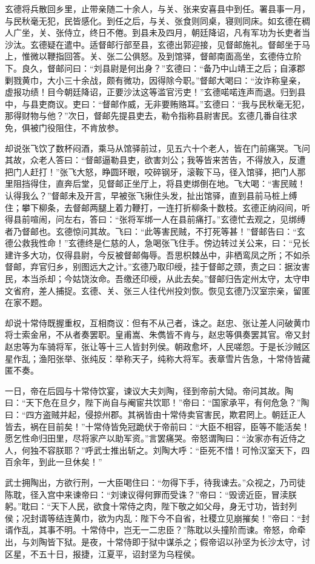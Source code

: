 玄德将兵散回乡里，止带亲随二十余人，与关、张来安喜县中到任。署县事一月，与民秋毫无犯，民皆感化。到任之后，与关、张食则同桌，寝则同床。如玄德在稠人广坐，关、张侍立，终日不倦。到县未及四月，朝廷降诏，凡有军功为长吏者当沙汰。玄德疑在遣中。适督邮行部至县，玄德出郭迎接，见督邮施礼。督邮坐于马上，惟微以鞭指回答。关、张二公俱怒。及到馆驿，督邮南面高坐，玄德侍立阶下。良久，督邮问曰：“刘县尉是何出身？”玄德曰：“备乃中山靖王之后；自涿郡剿戮黄巾，大小三十余战，颇有微功，因得除今职。”督邮大喝曰：“汝诈称皇亲，虚报功绩！目今朝廷降诏，正要沙汰这等滥官污吏！”玄德喏喏连声而退。归到县中，与县吏商议。吏曰：“督邮作威，无非要贿赂耳。”玄德曰：“我与民秋毫无犯，那得财物与他？”次日，督邮先提县吏去，勒令指称县尉害民。玄德几番自往求免，俱被门役阻住，不肯放参。

却说张飞饮了数杯闷酒，乘马从馆驿前过，见五六十个老人，皆在门前痛哭。飞问其故，众老人答曰：“督邮逼勒县吏，欲害刘公；我等皆来苦告，不得放入，反遭把门人赶打！”张飞大怒，睁圆环眼，咬碎钢牙，滚鞍下马，径入馆驿，把门人那里阻挡得住，直奔后堂，见督邮正坐厅上，将县吏绑倒在地。飞大喝：“害民贼！认得我么？”督邮未及开言，早被张飞揪住头发，扯出馆驿，直到县前马桩上缚住；攀下柳条，去督邮两腿上着力鞭打，一连打折柳条十数枝。玄德正纳闷间，听得县前喧闹，问左右，答曰：“张将军绑一人在县前痛打。”玄德忙去观之，见绑缚者乃督邮也。玄德惊问其故。飞曰：“此等害民贼，不打死等甚！”督邮告曰：“玄德公救我性命！”玄德终是仁慈的人，急喝张飞住手。傍边转过关公来，曰：“兄长建许多大功，仅得县尉，今反被督邮侮辱。吾思枳棘丛中，非栖鸾凤之所；不如杀督邮，弃官归乡，别图远大之计。”玄德乃取印绶，挂于督邮之颈，责之曰：据汝害民，本当杀却；今姑饶汝命。吾缴还印绶，从此去矣。”督邮归告定州太守，太守申文省府，差人捕捉。玄德、关、张三人往代州投刘恢。恢见玄德乃汉室宗亲，留匿在家不题。

却说十常侍既握重权，互相商议：但有不从己者，诛之。赵忠、张让差人问破黄巾将士索金帛，不从者奏罢职。皇甫嵩、朱儁皆不肯与，赵忠等俱奏罢其官。帝又封赵忠等为车骑将军，张让等十三人皆封列侯。朝政愈坏，人民嗟怨。于是长沙贼区星作乱；渔阳张举、张纯反：举称天子，纯称大将军。表章雪片告急，十常侍皆藏匿不奏。

一日，帝在后园与十常侍饮宴，谏议大夫刘陶，径到帝前大恸。帝问其故。陶曰：“天下危在旦夕，陛下尚自与阉宦共饮耶！”帝曰：“国家承平，有何危急？”陶曰：“四方盗贼并起，侵掠州郡。其祸皆由十常侍卖官害民，欺君罔上。朝廷正人皆去，祸在目前矣！”十常侍皆免冠跪伏于帝前曰：“大臣不相容，臣等不能活矣！愿乞性命归田里，尽将家产以助军资。”言罢痛哭。帝怒谓陶曰：“汝家亦有近侍之人，何独不容朕耶？”呼武士推出斩之。刘陶大呼：“臣死不惜！可怜汉室天下，四百余年，到此一旦休矣！”

武士拥陶出，方欲行刑，一大臣喝住曰：“勿得下手，待我谏去。”众视之，乃司徒陈耽，径入宫中来谏帝曰：“刘谏议得何罪而受诛？”帝曰：“毁谤近臣，冒渎朕躬。”耽曰：“天下人民，欲食十常侍之肉，陛下敬之如父母，身无寸功，皆封列侯；况封谞等结连黄巾，欲为内乱：陛下今不自省，社稷立见崩摧矣！”帝曰：“封谞作乱，其事不明。十常侍中，岂无一二忠臣？”陈耽以头撞阶而谏。帝怒，命牵出，与刘陶皆下狱。是夜，十常侍即于狱中谋杀之；假帝诏以孙坚为长沙太守，讨区星，不五十日，报捷，江夏平，诏封坚为乌程侯。

